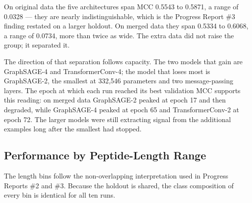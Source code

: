 \documentclass[11pt,a4paper]{article}
\begin{document}
On original data the five architectures span MCC 0.5543 to 0.5871, a range of 0.0328 --- they are nearly
indistinguishable, which is the Progress Report \#3 finding restated on a larger holdout. On merged data
they span 0.5334 to 0.6068, a range of 0.0734, more than twice as wide. The extra data did not raise the
group; it separated it.

The direction of that separation follows capacity. The two models that gain are GraphSAGE-4 and
TransformerConv-4; the model that loses most is GraphSAGE-2, the smallest at 332{,}546 parameters and two
message-passing layers. The epoch at which each run reached its best validation MCC supports this
reading: on merged data GraphSAGE-2 peaked at epoch 17 and then degraded, while GraphSAGE-4 peaked at
epoch 65 and TransformerConv-2 at epoch 72. The larger models were still extracting signal from the
additional examples long after the smallest had stopped.

\subsection{Performance by Peptide-Length Range}
The length bins follow the non-overlapping interpretation used in Progress Reports \#2 and \#3. Because
the holdout is shared, the class composition of every bin is identical for all ten runs.
\end{document}
